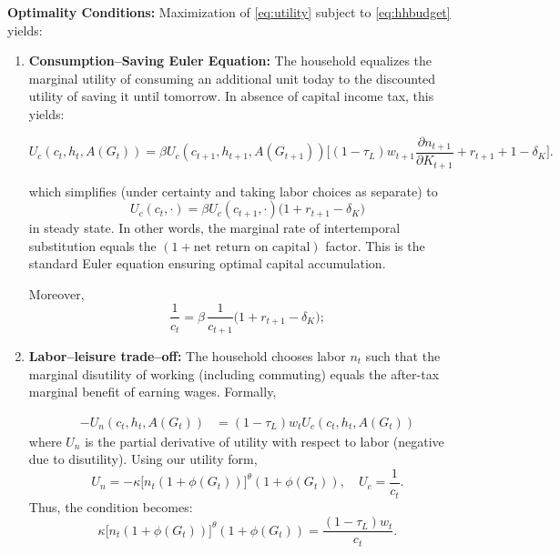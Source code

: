 {\bf Optimality Conditions:}
Maximization of \eqref{eq:utility} subject to \eqref{eq:hhbudget} yields:
\begin{enumerate}
  \item \textbf{Consumption–Saving Euler Equation:} The household equalizes the marginal utility of consuming an additional unit today to the discounted utility of saving it until tomorrow. In absence of capital income tax, this yields:

    \begin{equation}
    U_c(c_t, h_t, A(G_t)) = \beta U_c(c_{t+1}, h_{t+1}, A(G_{t+1})) \bigl[(1-\tau_L)w_{t+1} \frac{\partial n_{t+1}}{\partial K_{t+1}} + r_{t+1} + 1 - \delta_K\bigr].
    \end{equation}

    which simplifies (under certainty and taking labor choices as separate) to
    \begin{equation}
    U_c(c_t,\cdot) = \beta U_c(c_{t+1},\cdot)\bigl(1 + r_{t+1} - \delta_K\bigr)
    \end{equation}
    in steady state. In other words, the marginal rate of intertemporal substitution equals the \((1 + \text{net return on capital})\) factor. This is the standard Euler equation ensuring optimal capital accumulation.

    Moreover, 
    \begin{equation}
        \frac{1}{c_t} = \beta\,\frac{1}{c_{t+1}}\bigl(1+r_{t+1}-\delta_K\bigr);\label{eq:euler}
    \end{equation}


  \item \textbf{Labor--leisure trade–off:} The household chooses labor $n_t$ such that the marginal disutility of working (including commuting) equals the after-tax marginal benefit of earning wages. Formally,

    \begin{align}
    -U_n(c_t, h_t, A(G_t)) &= (1-\tau_L)w_t U_c(c_t, h_t, A(G_t))
    \end{align}
    where $U_n$ is the partial derivative of utility with respect to labor (negative due to disutility). Using our utility form, 
    \begin{equation}
    U_n = -\kappa \bigl[n_t(1+\phi(G_t))\bigr]^{\theta}(1+\phi(G_t)), \quad U_c = \frac{1}{c_t}.
    \end{equation}
    Thus, the condition becomes:
    \begin{equation}
    \kappa \bigl[n_t(1+\phi(G_t))\bigr]^{\theta}(1+\phi(G_t)) = \frac{(1-\tau_L)w_t}{c_t}.
    \end{equation}


\end{enumerate}
